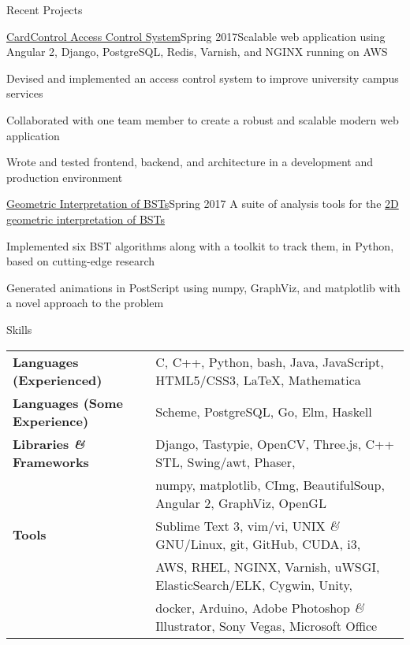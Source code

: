 \documentclass{resume}
\begin{document}
  \begin{rSection}{Recent Projects}
    \begin{rSubsection}{\href{https://github.com/CaerusKaru/cardcontrol}{CardControl Access Control System}}{Spring 2017}{Scalable web application using Angular 2, Django, PostgreSQL, Redis, Varnish, and NGINX running on AWS}{}
    \item Devised and implemented an access control system to improve university campus services
    \item Collaborated with one team member to create a robust and scalable modern web application
    \item Wrote and tested frontend, backend, and architecture in a development and production environment
    \end{rSubsection}
    
    \begin{rSubsection}{\href{https://github.com/forsooth/BST-analysis}{Geometric Interpretation of BSTs}}{Spring 2017}
    {A suite of analysis tools for the \href{https://en.wikipedia.org/wiki/Geometry_of_binary_search_trees}{2D geometric interpretation of BSTs}} {}
    \item Implemented six BST algorithms along with a toolkit to track them, in Python, based on cutting-edge research
    \item Generated animations in PostScript using numpy, GraphViz, and matplotlib with a novel approach to the problem
    \end{rSubsection}
  
  \end{rSection}
  
  \begin{rSection}{Skills}
    \begin{tabular}{ @{} >{\bfseries}l @{\hspace{6ex}} l }
      Languages (Experienced)& C, C++, Python, bash, Java, JavaScript, HTML5/CSS3, \LaTeX, Mathematica\\
      Languages (Some Experience)& Scheme, PostgreSQL, Go, Elm, Haskell\\
      Libraries \textit{\&} Frameworks & Django, Tastypie, OpenCV, Three.js, C++ STL, Swing/awt, Phaser,\\
      & numpy, matplotlib, CImg, BeautifulSoup, Angular 2, GraphViz, OpenGL\\
      Tools & Sublime Text 3, vim/vi, UNIX \textit{\&} GNU/Linux, git, GitHub, CUDA, i3,\\
      & AWS, RHEL, NGINX, Varnish, uWSGI, ElasticSearch/ELK, Cygwin, Unity,\\
      & docker, Arduino, Adobe Photoshop \textit{\&} Illustrator, Sony Vegas, Microsoft Office
    \end{tabular}
  \end{rSection}
\end{document}

